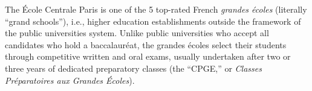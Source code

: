 \documentclass[11pt,a4paper]{moderncv}
\begin{document}
\iffalse
\section{Languages}
\cvlanguage{English}{Fluent}{}%
\cvlanguage{French}{Mother tongue}{}
\cvlanguage{Spanish, Italian}{Basic}{}
\fi




\flushleft
\footnotemark[1] \small{The \'{E}cole Centrale Paris is one of the 5 top-rated French \textit{grandes écoles} (literally ``grand schools''), i.e., higher education establishments outside the framework of the public universities system. Unlike public universities who accept all candidates who hold a baccalauréat, the grandes écoles select their students through competitive written and oral exams, usually undertaken after two or three years of dedicated preparatory classes (the ``CPGE,'' or \textit{Classes Préparatoires aux Grandes Écoles})}.

%
\end{document}
